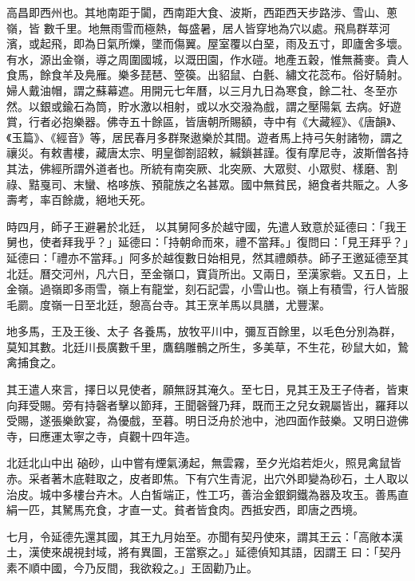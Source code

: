 \begin{pinyinscope}
 高昌即西州也。其地南距于闐，西南距大食、波斯，西距西天步路涉、雪山、蔥嶺，皆
 數千里。地無雨雪而極熱，每盛暑，居人皆穿地為穴以處。飛鳥群萃河濱，或起飛，即為日氣所爍，墜而傷翼。屋室覆以白堊，雨及五寸，即廬舍多壞。有水，源出金嶺，導之周圍國城，以溉田園，作水磑。地產五穀，惟無蕎麥。貴人食馬，餘食羊及鳧雁。樂多琵琶、箜篌。出貂鼠、白氎、繡文花蕊布。俗好騎射。婦人戴油帽，謂之蘇幕遮。用開元七年曆，以三月九日為寒食，餘二社、冬至亦然。以銀或鍮石為筒，貯水激以相射，或以水交潑為戲，謂之壓陽氣
 去病。好遊賞，行者必抱樂器。佛寺五十餘區，皆唐朝所賜額，寺中有《大藏經》、《唐韻》、《玉篇》、《經音》等，居民春月多群聚遨樂於其間。遊者馬上持弓矢射諸物，謂之禳災。有敕書樓，藏唐太宗、明皇御劄詔敕，緘鎖甚謹。復有摩尼寺，波斯僧各持其法，佛經所謂外道者也。所統有南突厥、北突厥、大眾熨、小眾熨、樣磨、割祿、黠戛司、末蠻、格哆族、預龍族之名甚眾。國中無貧民，絕食者共賑之。人多壽考，率百餘歲，絕地夭死。



 時四月，師子王避暑於北廷，
 以其舅阿多於越守國，先遣人致意於延德曰：「我王舅也，使者拜我乎？」延德曰：「持朝命而來，禮不當拜。」復問曰：「見王拜乎？」延德曰：「禮亦不當拜。」阿多於越復數日始相見，然其禮頗恭。師子王邀延德至其北廷。曆交河州，凡六日，至金嶺口，寶貨所出。又兩日，至漢家砦。又五日，上金嶺。過嶺即多雨雪，嶺上有龍堂，刻石記雲，小雪山也。嶺上有積雪，行人皆服毛罽。度嶺一日至北廷，憩高台寺。其王烹羊馬以具膳，尤豐潔。



 地多馬，王及王後、太子
 各養馬，放牧平川中，彌亙百餘里，以毛色分別為群，莫知其數。北廷川長廣數千里，鷹鷂雕鶻之所生，多美草，不生花，砂鼠大如，鷙禽捕食之。



 其王遣人來言，擇日以見使者，願無訝其淹久。至七日，見其王及王子侍者，皆東向拜受賜。旁有持磬者擊以節拜，王聞磬聲乃拜，既而王之兒女親屬皆出，羅拜以受賜，遂張樂飲宴，為優戲，至暮。明日泛舟於池中，池四面作鼓樂。又明日遊佛寺，曰應運太寧之寺，貞觀十四年造。



 北廷北山中出
 硇砂，山中嘗有煙氣湧起，無雲霧，至夕光焰若炬火，照見禽鼠皆赤。采者著木底鞋取之，皮者即焦。下有穴生青泥，出穴外即變為砂石，土人取以治皮。城中多樓台卉木。人白皙端正，性工巧，善治金銀銅鐵為器及攻玉。善馬直絹一匹，其駑馬充食，才直一丈。貧者皆食肉。西抵安西，即唐之西境。



 七月，令延德先還其國，其王九月始至。亦聞有契丹使來，謂其王云：「高敞本漢土，漢使來覘視封域，將有異圖，王當察之。」延德偵知其語，因謂王
 曰：「契丹素不順中國，今乃反間，我欲殺之。」王固勸乃止。




\end{pinyinscope}
